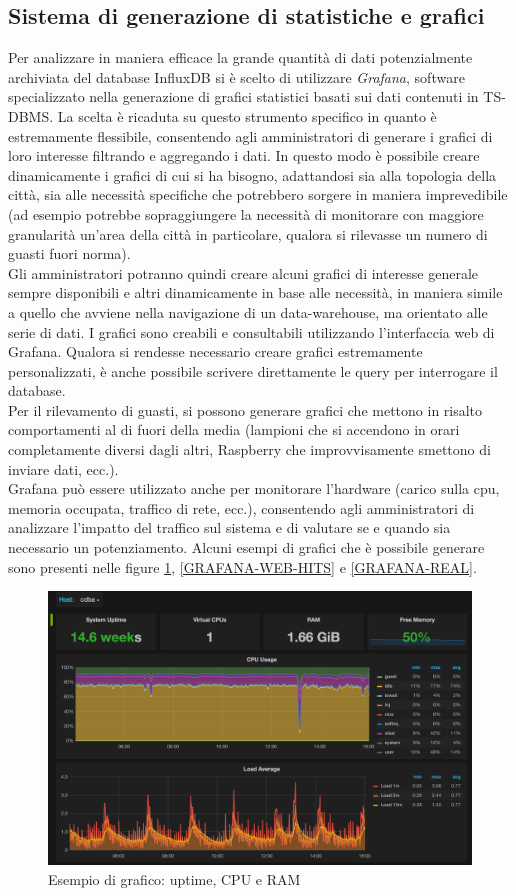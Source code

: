 \subsection{Sistema di generazione di statistiche e grafici}
Per analizzare in maniera efficace la grande quantità di dati potenzialmente archiviata del database InfluxDB si è scelto di utilizzare \textit{Grafana}, software specializzato nella generazione di grafici statistici basati sui dati contenuti in TS-DBMS.
La scelta è ricaduta su questo strumento specifico in quanto è estremamente flessibile, consentendo agli amministratori di generare i grafici di loro interesse filtrando e aggregando i dati.
In questo modo è possibile creare dinamicamente i grafici di cui si ha bisogno, adattandosi sia alla topologia della città, sia alle necessità specifiche che potrebbero sorgere in maniera imprevedibile (ad esempio potrebbe sopraggiungere la necessità di monitorare con maggiore granularità un'area della città in particolare, qualora si rilevasse un numero di guasti fuori norma).
\\Gli amministratori potranno quindi creare alcuni grafici di interesse generale sempre disponibili e altri dinamicamente in base alle necessità, in maniera simile a quello che avviene nella navigazione di un data-warehouse, ma orientato alle serie di dati.
I grafici sono creabili e consultabili utilizzando l'interfaccia web di Grafana. Qualora si rendesse necessario creare grafici estremamente personalizzati, è anche possibile scrivere direttamente le query per interrogare il database.
\\Per il rilevamento di guasti, si possono generare grafici che mettono in risalto comportamenti al di fuori della media (lampioni che si accendono in orari completamente diversi dagli altri, Raspberry che improvvisamente smettono di inviare dati, ecc.).
\\Grafana può essere utilizzato anche per monitorare l'hardware (carico sulla cpu, memoria occupata, traffico di rete, ecc.), consentendo agli amministratori di analizzare l'impatto del traffico sul sistema e di valutare se e quando sia necessario un potenziamento.
Alcuni esempi di grafici che è possibile generare sono presenti nelle figure \ref{GRAFANA-CPU}, \ref{GRAFANA-WEB-HITS} e \ref{GRAFANA-REAL}.
\begin{figure}[tbp]
	\centering
	\includegraphics[scale=0.35]{figure/grafana_cpu.png}
	\caption{Esempio di grafico: uptime, CPU e RAM \label{GRAFANA-CPU}}
\end{figure}
